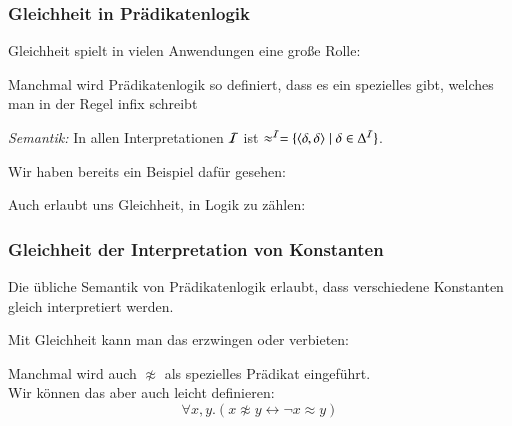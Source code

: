\documentclass[onlymath]{beamer}
\begin{document}
\begin{frame}\frametitle{Gleichheit in Prädikatenlogik}

Gleichheit spielt in vielen Anwendungen eine große Rolle:\smallskip

Manchmal wird Prädikatenlogik so definiert, dass es ein
spezielles  gibt, welches man in der Regel infix schreibt
\bigskip

\emph{Semantik:} In allen Interpretationen $\mathcal{I}$ ist $\approx^{\mathcal{I}}=\{\langle{\delta,\delta}\rangle\mid \delta\in\Delta^{\mathcal{I}}\}$.
\bigskip\pause

Wir haben bereits ein Beispiel dafür gesehen:

\pause

Auch erlaubt uns Gleichheit, in Logik zu zählen:



\end{frame}

\begin{frame}\frametitle{Gleichheit der Interpretation von Konstanten}

Die übliche Semantik von Prädikatenlogik erlaubt, dass verschiedene 
Konstanten gleich interpretiert werden.\bigskip

Mit Gleichheit kann man das erzwingen oder verbieten:

Manchmal wird auch $\not\approx$ als spezielles Prädikat eingeführt.\\
Wir können das aber auch leicht definieren:
\[ \forall x,y.(x\not\approx y\leftrightarrow \neg x\approx y)\]

\end{frame}
\end{document}
